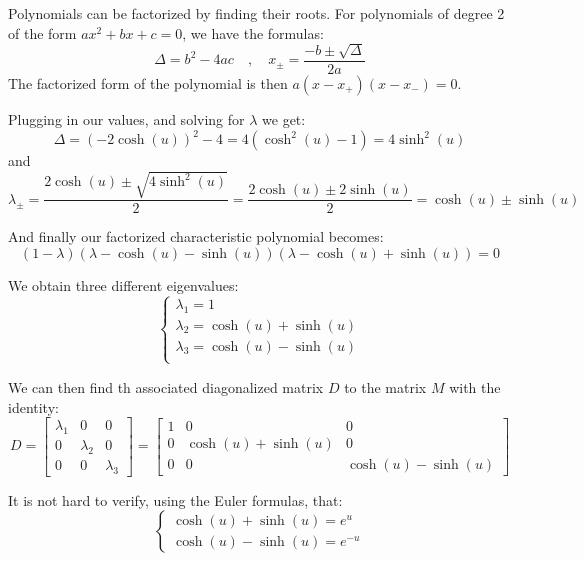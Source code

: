 \documentclass{article}
\begin{document}
Polynomials can be factorized by finding their roots. For polynomials of degree 2 of the form $ax^2+bx+c = 0$, we have the formulas:
\begin{equation}
    \Delta = b^2 -4ac \quad,\quad x_{\pm} = \frac{-b \pm \sqrt{\Delta}}{2a}
\end{equation}
The factorized form of the polynomial is then $a(x-x_+)(x-x_-) = 0$.

Plugging in our values, and solving for $\lambda$ we get:
\begin{equation*}
    \Delta = (-2\cosh(u))^2-4 = 4(\cosh^2(u)-1) = 4\sinh^2(u)
\end{equation*} and
\begin{equation*}
    \lambda_{\pm} = \frac{2\cosh(u) \pm \sqrt{4\sinh^2(u)}}{2} = \frac{2\cosh(u) \pm 2\sinh(u)}{2} = \cosh(u) \pm \sinh(u)
\end{equation*}

And finally our factorized characteristic polynomial becomes:
\begin{equation}
    (1 - \lambda)(\lambda - \cosh(u) - \sinh(u))(\lambda - \cosh(u) + \sinh(u)) = 0
\end{equation}

We obtain three different eigenvalues:
\begin{equation}
    \begin{cases}
        \lambda_1 = 1 \\
        \lambda_2 = \cosh(u) + \sinh(u) \\
        \lambda_3 = \cosh(u) - \sinh(u) \\
    \end{cases}
\end{equation}

We can then find th associated diagonalized matrix $D$ to the matrix $M$ with the identity:
\begin{equation}
D = \begin{bmatrix} \lambda_1 & 0 & 0 \\ 0 & \lambda_2 & 0 \\ 0 & 0 & \lambda_3 \end{bmatrix} = \begin{bmatrix} 1 & 0 & 0 \\ 0 & \cosh(u)+\sinh(u) & 0 \\ 0 & 0 & \cosh(u) - \sinh(u) \end{bmatrix} 
\end{equation}

It is not hard to verify, using the Euler formulas, that:
\begin{equation}
    \begin{cases}
        \cosh(u) + \sinh(u) = e^u \\
        \cosh(u) - \sinh(u) = e^{-u}
    \end{cases}
\end{equation}
\end{document}
